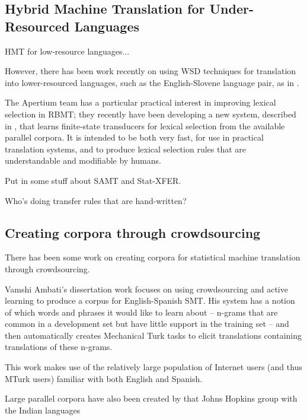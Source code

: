 \subsection{Hybrid Machine Translation for Under-Resourced Languages}
HMT for low-resource languages...

However, there has been work recently on using WSD techniques for translation
into lower-resourced languages, such as the English-Slovene language pair, as
in \cite{vintar-fivser-vrvsvcaj:2012:ESIRMT-HyTra2012}. 

The Apertium team has a particular practical interest in improving lexical
selection in RBMT; they recently have been developing
a new system, described in \cite{tyers-fst}, that learns finite-state
transducers for lexical selection from the available parallel corpora. It is
intended to be both very fast, for use in practical translation systems, and
to produce lexical selection rules that are understandable and modifiable by
humans.

Put in some stuff about SAMT and Stat-XFER.

Who's doing transfer rules that are hand-written?




\subsection{Creating corpora through crowdsourcing}

There has been some work on creating corpora for statistical machine
translation through crowdsourcing.

Vamshi Ambati's dissertation work focuses on using crowdsourcing and active
learning to produce a corpus for English-Spanish SMT. His system has a notion
of which words and phrases it would like to learn about -- n-grams that are
common in a development set but have little support in the training set -- and
then automatically creates Mechanical Turk tasks to elicit translations
containing translations of these n-grams.

This work makes use of the relatively large population of Internet users (and
thus MTurk users) familiar with both English and Spanish.

\cite{ambati_naacl}

\cite{ambati_act}

Large parallel corpora have also been created by that Johns Hopkins group
with the Indian languages
\cite{post-callisonburch-osborne:2012:WMT}

